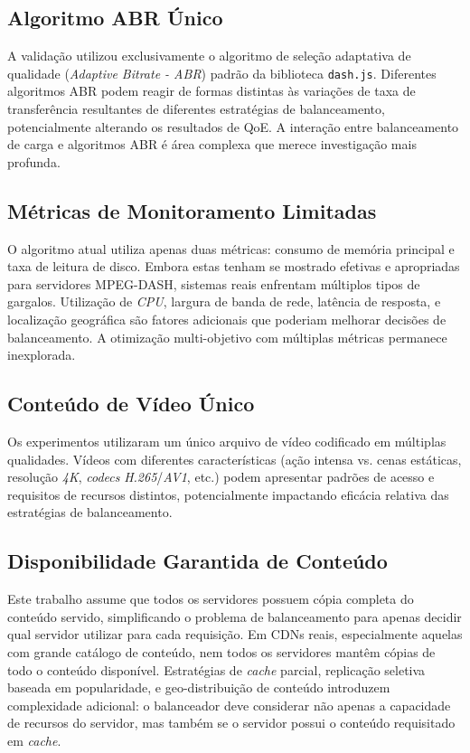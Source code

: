 \subsection{Algoritmo ABR Único}

A validação utilizou exclusivamente o algoritmo de seleção adaptativa de qualidade (\textit{Adaptive Bitrate - ABR}) padrão da biblioteca \texttt{dash.js}. Diferentes algoritmos ABR podem reagir de formas distintas às variações de taxa de transferência resultantes de diferentes estratégias de balanceamento, potencialmente alterando os resultados de QoE. A interação entre balanceamento de carga e algoritmos ABR é área complexa que merece investigação mais profunda.

\subsection{Métricas de Monitoramento Limitadas}

O algoritmo atual utiliza apenas duas métricas: consumo de memória principal e taxa de leitura de disco. Embora estas tenham se mostrado efetivas e apropriadas para servidores MPEG-DASH, sistemas reais enfrentam múltiplos tipos de gargalos. Utilização de \textit{CPU}, largura de banda de rede, latência de resposta, e localização geográfica são fatores adicionais que poderiam melhorar decisões de balanceamento. A otimização multi-objetivo com múltiplas métricas permanece inexplorada.

\subsection{Conteúdo de Vídeo Único}

Os experimentos utilizaram um único arquivo de vídeo codificado em múltiplas qualidades. Vídeos com diferentes características (ação intensa vs. cenas estáticas, resolução \textit{4K}, \textit{codecs} \textit{H.265}/\textit{AV1}, etc.) podem apresentar padrões de acesso e requisitos de recursos distintos, potencialmente impactando eficácia relativa das estratégias de balanceamento.

\subsection{Disponibilidade Garantida de Conteúdo}

Este trabalho assume que todos os servidores possuem cópia completa do conteúdo servido, simplificando o problema de balanceamento para apenas decidir qual servidor utilizar para cada requisição. Em CDNs reais, especialmente aquelas com grande catálogo de conteúdo, nem todos os servidores mantêm cópias de todo o conteúdo disponível. Estratégias de \textit{cache} parcial, replicação seletiva baseada em popularidade, e geo-distribuição de conteúdo introduzem complexidade adicional: o balanceador deve considerar não apenas a capacidade de recursos do servidor, mas também se o servidor possui o conteúdo requisitado em \textit{cache}.

